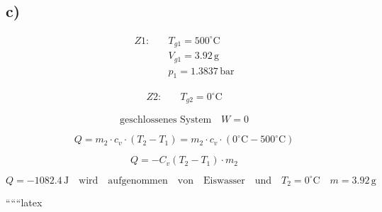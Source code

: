 

\subsection*{c)}
\begin{align*}
    Z1: & \quad T_{g1} = 500^\circ \text{C} \\
    & \quad V_{g1} = 3.92 \, \text{g} \\
    & \quad p_{1} = 1.3837 \, \text{bar}
\end{align*}

\begin{align*}
    Z2: & \quad T_{g2} = 0^\circ \text{C}
\end{align*}

\[
\text{geschlossenes System} \quad W = 0
\]

\[
Q = m_{2} \cdot c_{v} \cdot (T_{2} - T_{1}) = m_{2} \cdot c_{v} \cdot (0^\circ \text{C} - 500^\circ \text{C})
\]

\[
Q = -C_{v}(T_{2} - T_{1}) \cdot m_{2}
\]

\[
Q = -1082.4 \, \text{J} \quad \text{wird} \quad \text{aufgenommen} \quad \text{von} \quad \text{Eiswasser} \quad \text{und} \quad T_{2} = 0^\circ \text{C} \quad m = 3.92 \, \text{g}
\]

``````latex